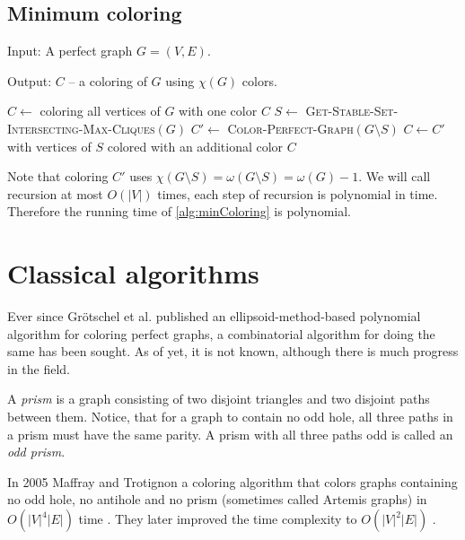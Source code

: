 \subsection{Minimum coloring}

\begin{alg}
  \label{alg:minColoring}
  Input: A perfect graph $G = (V, E)$.

  \noindent Output: $C$ -- a coloring of $G$ using $\chi(G)$ colors.
\end{alg}

\begin{algorithmic}[1]
    \ls $C \gets$ coloring all vertices of $G$ with one color
    \ls \RETURN $C$
  \mElse
    \ls $S \gets$ \textsc{Get-Stable-Set-Intersecting-Max-Cliques}$(G)$
    \ls $C' \gets$ \textsc{Color-Perfect-Graph}$(G \setminus S)$
    \ls $C \gets C'$ with vertices of $S$ colored with an additional color
    \ls \RETURN $C$
  \mEndIf
  \mEndProcedure
\end{algorithmic}

Note that coloring $C'$ uses $\chi(G \setminus S) = \omega(G \setminus S) = \omega(G) -1$. We will call recursion at most $O(|V|)$ times, each step of recursion is polynomial in time. Therefore the running time of \cref{alg:minColoring} is polynomial.

\section{Classical algorithms}
\label{sec:classicalColoring}

Ever since Grötschel et al. published an ellipsoid-method-based polynomial algorithm for coloring perfect graphs, a combinatorial algorithm for doing the same has been sought. As of yet, it is not known, although there is much progress in the field.

\begin{defn}[prism]
  A \emph{prism} is a graph consisting of two disjoint triangles and two disjoint paths between them. Notice, that for a graph to contain no odd hole, all three paths in a prism must have the same parity. A prism with all three paths odd is called an \emph{odd prism}.
  \label{def:prism}
\end{defn}

In 2005 Maffray and Trotignon a coloring algorithm that colors graphs containing no odd hole, no antihole and no prism (sometimes called Artemis graphs) in $O(|V|^4|E|)$ time \cite{Maffray2006}. They later improved the time complexity to $O(|V|^2|E|)$ \cite{Lvque2009}.

